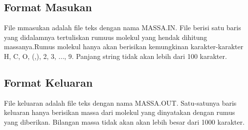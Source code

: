 \documentclass[a4paper,10pt,makeidx]{article}
\begin{document}
\subsection{Format Masukan}
\par
\indent
\indent
File mmasukan adalah file teks dengan nama MASSA.IN. File berisi satu baris
yang didalamnya tertuliskan rumuus molekul yang hendak dihitung massanya.Rumus
molekul hanya akan berisikan kemungkinan karakter-karakter H, C, O, (,), 2,
3, ..., 9. Panjang string tidak akan lebih dari 100 karakter.
\par
\indent
\indent
\subsection{Format Keluaran}
\par
\indent
\indent
File keluaran adalah file teks dengan nama MASSA.OUT. Satu-satunya baris keluaran
hanya berisikan massa dari molekul yang dinyatakan dengan rumus yang diberikan.
Bilangan massa tidak akan akan lebih besar dari 1000 karakter.
\par
\indent
\indent
\end{document}
